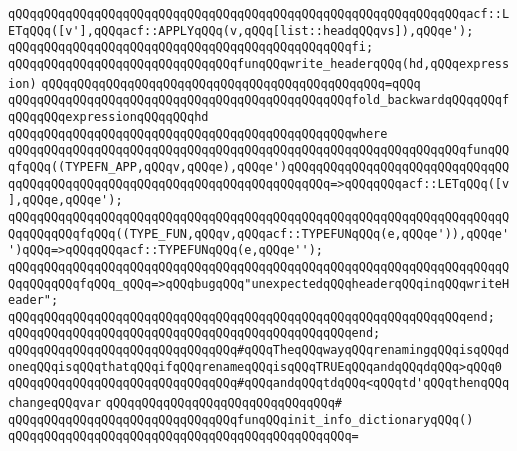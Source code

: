 \newline
\verb|qQQqqQQqqQQqqQQqqQQqqQQqqQQqqQQqqQQqqQQqqQQqqQQqqQQqqQQqqQQqqQQqacf::LETqQQq([v'],qQQqacf::APPLYqQQq(v,qQQq[list::headqQQqvs]),qQQqe');|\newline
\verb|qQQqqQQqqQQqqQQqqQQqqQQqqQQqqQQqqQQqqQQqqQQqqQQqfi;|\newline
\newline
\newline
\verb|qQQqqQQqqQQqqQQqqQQqqQQqqQQqqQQqfunqQQqwrite_headerqQQq(hd,qQQqexpression)|\newline
\verb|qQQqqQQqqQQqqQQqqQQqqQQqqQQqqQQqqQQqqQQqqQQqqQQq=qQQq|\newline
\verb|qQQqqQQqqQQqqQQqqQQqqQQqqQQqqQQqqQQqqQQqqQQqqQQqfold_backwardqQQqqQQqfqQQqqQQqexpressionqQQqqQQqhd|\newline
\verb|qQQqqQQqqQQqqQQqqQQqqQQqqQQqqQQqqQQqqQQqqQQqqQQqwhere|\newline
\verb|qQQqqQQqqQQqqQQqqQQqqQQqqQQqqQQqqQQqqQQqqQQqqQQqqQQqqQQqqQQqqQQqfunqQQqfqQQq((TYPEFN_APP,qQQqv,qQQqe),qQQqe')qQQqqQQqqQQqqQQqqQQqqQQqqQQqqQQqqQQqqQQqqQQqqQQqqQQqqQQqqQQqqQQqqQQqqQQqqQQq=>qQQqqQQqacf::LETqQQq([v],qQQqe,qQQqe');|\newline
\verb|qQQqqQQqqQQqqQQqqQQqqQQqqQQqqQQqqQQqqQQqqQQqqQQqqQQqqQQqqQQqqQQqqQQqqQQqqQQqqQQqfqQQq((TYPE_FUN,qQQqv,qQQqacf::TYPEFUNqQQq(e,qQQqe')),qQQqe'')qQQq=>qQQqqQQqacf::TYPEFUNqQQq(e,qQQqe'');|\newline
\verb|qQQqqQQqqQQqqQQqqQQqqQQqqQQqqQQqqQQqqQQqqQQqqQQqqQQqqQQqqQQqqQQqqQQqqQQqqQQqqQQqfqQQq_qQQq=>qQQqbugqQQq"unexpectedqQQqheaderqQQqinqQQqwriteHeader";|\newline
\verb|qQQqqQQqqQQqqQQqqQQqqQQqqQQqqQQqqQQqqQQqqQQqqQQqqQQqqQQqqQQqqQQqend;|\newline
\verb|qQQqqQQqqQQqqQQqqQQqqQQqqQQqqQQqqQQqqQQqqQQqqQQqend;|\newline
\newline
\newline
\verb|qQQqqQQqqQQqqQQqqQQqqQQqqQQqqQQq#qQQqTheqQQqwayqQQqrenamingqQQqisqQQqdoneqQQqisqQQqthatqQQqifqQQqrenameqQQqisqQQqTRUEqQQqandqQQqdqQQq>qQQq0|\newline
\verb|qQQqqQQqqQQqqQQqqQQqqQQqqQQqqQQq#qQQqandqQQqtdqQQq<qQQqtd'qQQqthenqQQqchangeqQQqvar|\newline
\verb|qQQqqQQqqQQqqQQqqQQqqQQqqQQqqQQq#|\newline
\verb|qQQqqQQqqQQqqQQqqQQqqQQqqQQqqQQqfunqQQqinit_info_dictionaryqQQq()|\newline
\verb|qQQqqQQqqQQqqQQqqQQqqQQqqQQqqQQqqQQqqQQqqQQqqQQq=|\newline
